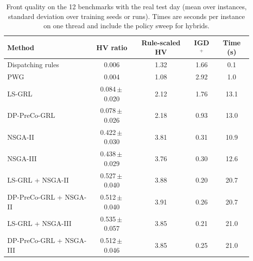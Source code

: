\begin{table}[htbp]
\centering
\caption{Front quality on the 12 benchmarks with the real test day (mean over instances, standard deviation over training seeds or runs). Times are seconds per instance on one thread and include the policy sweep for hybrids.}
\label{tab:main}
\footnotesize
\begin{tabular}{lcccc}
\toprule
Method & HV ratio & Rule-scaled HV & IGD$^+$ & Time (s) \\
\midrule
Dispatching rules & 0.006 & 1.32 & 1.66 & 0.1 \\
PWG & 0.004 & 1.08 & 2.92 & 1.0 \\
LS-GRL & 0.084\,$\pm$\,0.020 & 2.12 & 1.76 & 13.1 \\
DP-PreCo-GRL & 0.078\,$\pm$\,0.026 & 2.18 & 0.93 & 13.0 \\
NSGA-II & 0.422\,$\pm$\,0.030 & 3.81 & 0.31 & 10.9 \\
NSGA-III & 0.438\,$\pm$\,0.029 & 3.76 & 0.30 & 12.6 \\
LS-GRL + NSGA-II & 0.527\,$\pm$\,0.040 & 3.88 & 0.20 & 20.7 \\
DP-PreCo-GRL + NSGA-II & 0.512\,$\pm$\,0.040 & 3.91 & 0.26 & 20.7 \\
LS-GRL + NSGA-III & 0.535\,$\pm$\,0.057 & 3.85 & 0.21 & 21.0 \\
DP-PreCo-GRL + NSGA-III & 0.512\,$\pm$\,0.046 & 3.85 & 0.25 & 21.0 \\
\bottomrule
\end{tabular}
\end{table}
